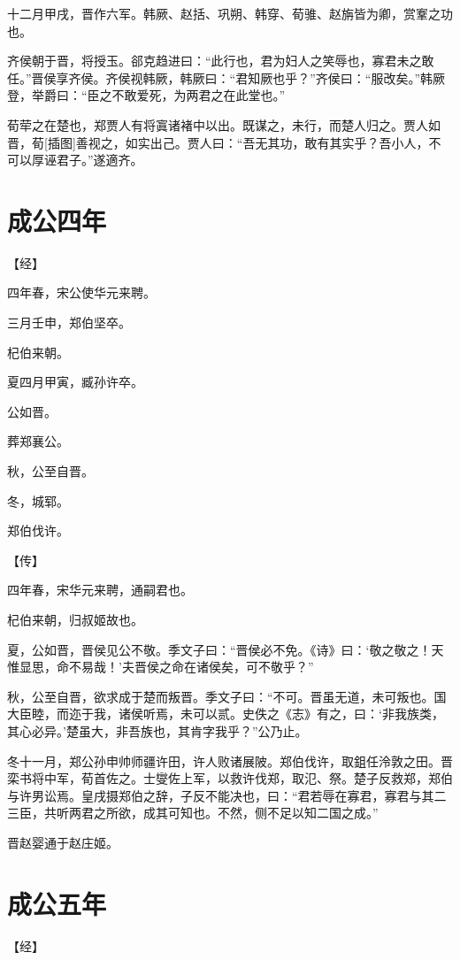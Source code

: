 \documentclass[a4paper,12pt,UTF8,twoside]{ctexbook}
\begin{document}
十二月甲戌，晋作六军。韩厥、赵括、巩朔、韩穿、荀骓、赵旃皆为卿，赏鞌之功也。

齐侯朝于晋，将授玉。郤克趋进曰：“此行也，君为妇人之笑辱也，寡君未之敢任。”晋侯享齐侯。齐侯视韩厥，韩厥曰：“君知厥也乎？”齐侯曰：“服改矣。”韩厥登，举爵曰：“臣之不敢爱死，为两君之在此堂也。”

荀荦之在楚也，郑贾人有将寘诸褚中以出。既谋之，未行，而楚人归之。贾人如晋，荀[插图]善视之，如实出己。贾人曰：“吾无其功，敢有其实乎？吾小人，不可以厚诬君子。”遂適齐。

\section{成公四年}



【经】

四年春，宋公使华元来聘。

三月壬申，郑伯坚卒。

杞伯来朝。

夏四月甲寅，臧孙许卒。

公如晋。

葬郑襄公。

秋，公至自晋。

冬，城郓。

郑伯伐许。

【传】

四年春，宋华元来聘，通嗣君也。

杞伯来朝，归叔姬故也。

夏，公如晋，晋侯见公不敬。季文子曰：“晋侯必不免。《诗》曰：‘敬之敬之！天惟显思，命不易哉！’夫晋侯之命在诸侯矣，可不敬乎？”

秋，公至自晋，欲求成于楚而叛晋。季文子曰：“不可。晋虽无道，未可叛也。国大臣睦，而迩于我，诸侯听焉，未可以贰。史佚之《志》有之，曰：‘非我族类，其心必异。’楚虽大，非吾族也，其肯字我乎？”公乃止。

冬十一月，郑公孙申帅师疆许田，许人败诸展陂。郑伯伐许，取鉏任泠敦之田。晋栾书将中军，荀首佐之。士燮佐上军，以救许伐郑，取氾、祭。楚子反救郑，郑伯与许男讼焉。皇戌摄郑伯之辞，子反不能决也，曰：“君若辱在寡君，寡君与其二三臣，共听两君之所欲，成其可知也。不然，侧不足以知二国之成。”

晋赵婴通于赵庄姬。


\section{成公五年}



【经】
\end{document}
